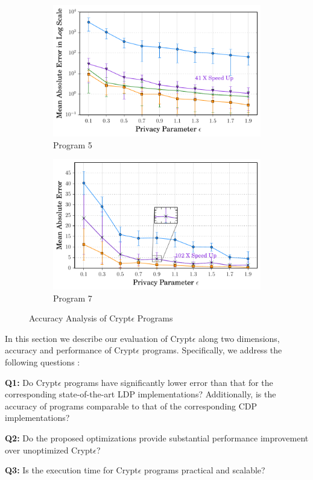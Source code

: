\begin{figure}[ht]
\begin{subfigure}[b]{0.25\linewidth}
    \centering    \includegraphics[width=1\linewidth]{5_final.pdf}
        \caption{Program 5}
        \label{fig:P5}\end{subfigure}%
      \begin{subfigure}[b]{0.25\linewidth}
    \centering    \includegraphics[width=1\linewidth]{7_final.pdf}
        \caption{Program 7}
        \label{fig:P7}
    \end{subfigure}
   \caption{Accuracy Analysis of Crypt$\epsilon$ Programs}
   \label{accuracy}
\end{figure}
In this section we describe our evaluation of Crypt$\epsilon$ along two dimensions, accuracy and  performance of Crypt$\epsilon$ programs. Specifically, we address the following questions : \squishlist \item \textbf{Q1:} Do Crypt$\epsilon$ programs have significantly lower error than that for the corresponding state-of-the-art \textsf{LDP} implementations? Additionally, is the accuracy of \system programs comparable to that of the corresponding \textsf{CDP} implementations? \item \textbf{Q2:} Do the proposed optimizations provide substantial performance improvement over unoptimized Crypt$\epsilon$? \item \textbf{Q3:} Is the execution time for Crypt$\epsilon$ programs practical and scalable? \squishend
